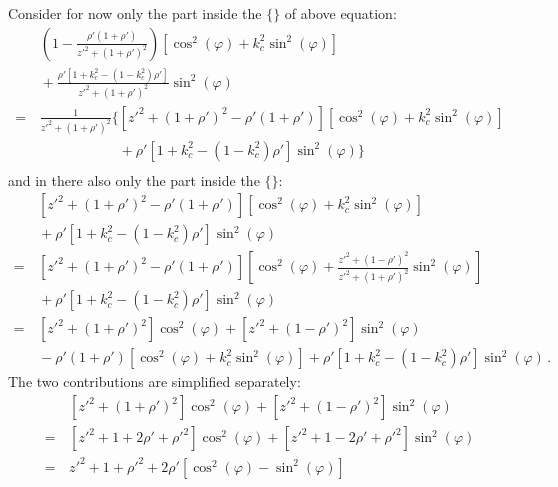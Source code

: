 Consider for now only the part inside the $\{\}$ of above equation:
\begin{align}
 ~&\,   \left( 1 - \frac{\rho' (1+\rho')}{z'^2 + (1 + \rho')^2} \right)
        \left[ \cos^2(\varphi) + k_c^2 \sin^2(\varphi) \right] \nonumber \\
 ~&\, + \frac{\rho' \left[1 + k_c^2 - (1 - k_c^2) \rho'\right]}{z'^2 + (1 + \rho')^2} \sin^2(\varphi) \nonumber \\
 =&\, \frac{1}{z'^2 + (1 + \rho')^2} \Biggl\{
        \left[ z'^2 + (1 + \rho')^2 - \rho' (1+\rho') \right] \left[ \cos^2(\varphi) + k_c^2 \sin^2(\varphi) \right] \nonumber \\
 ~&\, \phantom{\frac{1}{z'^2 + (1 + \rho')^2} \Biggl\{}
      + \rho' \left[1 + k_c^2 - (1 - k_c^2) \rho'\right] \sin^2(\varphi) \Biggr\}
\end{align}
and in there also only the part inside the $\{\}$:
\begin{align}
 ~&\, \left[ z'^2 + (1 + \rho')^2 - \rho' (1+\rho') \right] \left[ \cos^2(\varphi) + k_c^2 \sin^2(\varphi) \right] \nonumber \\
 ~&\, + \rho' \left[1 + k_c^2 - (1 - k_c^2) \rho'\right] \sin^2(\varphi) \nonumber \\
 =&\, \left[ z'^2 + (1 + \rho')^2 - \rho' (1+\rho') \right] \left[ \cos^2(\varphi) + \frac{z'^2 + (1 - \rho')^2}{z'^2 + (1 + \rho')^2} \sin^2(\varphi) \right] \nonumber \\
 ~&\, + \rho' \left[1 + k_c^2 - (1 - k_c^2) \rho'\right] \sin^2(\varphi) \nonumber \\
 =&\, \left[ z'^2 + (1 + \rho')^2 \right] \cos^2(\varphi) + \left[ z'^2 + (1 - \rho')^2 \right] \sin^2(\varphi)                                      \nonumber \\
 ~&\, - \rho' (1+\rho') \left[ \cos^2(\varphi) + k_c^2 \sin^2(\varphi) \right] + \rho' \left[1 + k_c^2 - (1 - k_c^2) \rho'\right] \sin^2(\varphi) \, . \label{eqn:starStar}
\end{align}
The two contributions are simplified separately:
\begin{align}
 ~&\, \left[ z'^2 + (1 + \rho')^2 \right] \cos^2(\varphi) + \left[ z'^2 + (1 - \rho')^2 \right] \sin^2(\varphi) \nonumber \\
 =&\, \left[ z'^2 + 1 + 2 \rho' + \rho'^2 \right] \cos^2(\varphi) + \left[ z'^2 + 1 - 2 \rho' + \rho'^2  \right] \sin^2(\varphi) \nonumber \\
 =&\, z'^2 + 1 + \rho'^2 + 2 \rho' \left[ \cos^2(\varphi) - \sin^2(\varphi) \right] \label{eqn:intermediate1}
\end{align}
